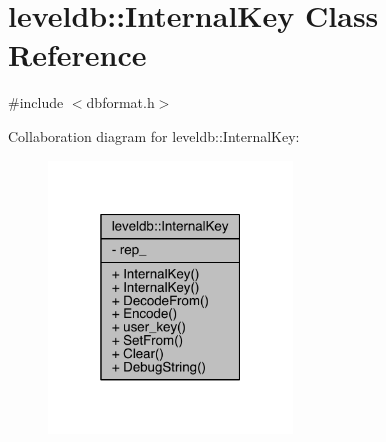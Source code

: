 \hypertarget{classleveldb_1_1_internal_key}{}\section{leveldb\+:\+:Internal\+Key Class Reference}
\label{classleveldb_1_1_internal_key}


{\ttfamily \#include $<$dbformat.\+h$>$}



Collaboration diagram for leveldb\+:\+:Internal\+Key\+:\nopagebreak
\begin{figure}[H]
\begin{center}
\leavevmode
\includegraphics[width=184pt]{classleveldb_1_1_internal_key__coll__graph}
\end{center}
\end{figure}
